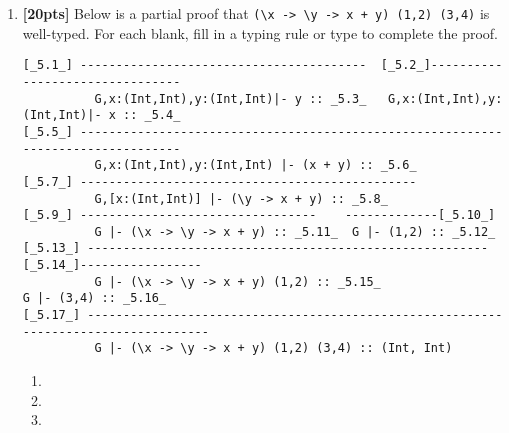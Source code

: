 \documentclass[paper=letter, fontsize=13pt]{article} %
\numberwithin{equation}{section} %
\begin{document}
\begin{enumerate}
\begin{enumerate}[label*=\arabic*]
  \item {}
  \item {}
\end{enumerate}

\newpage
\item \textbf{[20pts]} Below is a partial proof that \verb|(\x -> \y -> x + y) (1,2) (3,4)| is well-typed. 
For each blank, fill in a typing rule or type to complete the proof.
\begin{figure*}[h]
\begin{verbatim}
[_5.1_] ----------------------------------------  [_5.2_]--------------------------------
          G,x:(Int,Int),y:(Int,Int)|- y :: _5.3_   G,x:(Int,Int),y:(Int,Int)|- x :: _5.4_  
[_5.5_] ---------------------------------------------------------------------------------
          G,x:(Int,Int),y:(Int,Int) |- (x + y) :: _5.6_ 
[_5.7_] -----------------------------------------------
          G,[x:(Int,Int)] |- (\y -> x + y) :: _5.8_ 
[_5.9_] ---------------------------------    -------------[_5.10_]                        
          G |- (\x -> \y -> x + y) :: _5.11_  G |- (1,2) :: _5.12_
[_5.13_] -------------------------------------------------------- [_5.14_]-----------------
          G |- (\x -> \y -> x + y) (1,2) :: _5.15_                     G |- (3,4) :: _5.16_
[_5.17_] ------------------------------------------------------------------------------------
          G |- (\x -> \y -> x + y) (1,2) (3,4) :: (Int, Int)
\end{verbatim}
\end{figure*}
\begin{enumerate}[label*=\arabic*]
  \item {}
  \item {}
  \item {}

\end{enumerate}
\end{enumerate}
\end{document}
